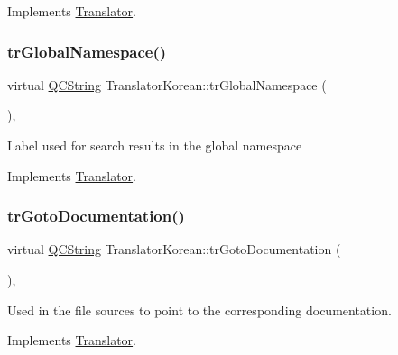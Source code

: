 Implements \mbox{\hyperlink{class_translator}{Translator}}.

\mbox{\label{class_translator_korean_a8678e9f40973a9741c3056712e369abc}} 
\subsubsection{\texorpdfstring{trGlobalNamespace()}{trGlobalNamespace()}}
{\footnotesize\ttfamily virtual \mbox{\hyperlink{class_q_c_string}{Q\+C\+String}} Translator\+Korean\+::tr\+Global\+Namespace (\begin{DoxyParamCaption}{ }\end{DoxyParamCaption})\hspace{0.3cm}{\ttfamily [inline]}, {\ttfamily [virtual]}}

Label used for search results in the global namespace 

Implements \mbox{\hyperlink{class_translator}{Translator}}.

\mbox{\label{class_translator_korean_aac238fd69bed086c5ab922c49684c2ce}} 
\subsubsection{\texorpdfstring{trGotoDocumentation()}{trGotoDocumentation()}}
{\footnotesize\ttfamily virtual \mbox{\hyperlink{class_q_c_string}{Q\+C\+String}} Translator\+Korean\+::tr\+Goto\+Documentation (\begin{DoxyParamCaption}{ }\end{DoxyParamCaption})\hspace{0.3cm}{\ttfamily [inline]}, {\ttfamily [virtual]}}

Used in the file sources to point to the corresponding documentation. 

Implements \mbox{\hyperlink{class_translator}{Translator}}.

\mbox{\label{class_translator_korean_a79b17bf6dc1086ee02bf54d8af4bb509}} 
